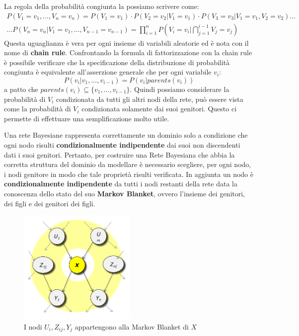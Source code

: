 La regola della probabilità congiunta la possiamo scrivere come:
\begin{equation*}
    \begin{aligned}
        P(V_1= v_1,...,V_n = v_n) = P(V_1 = v_1) \cdot P(V_2 = v_2|V_1 = v_1)
        \cdot P(V_3 = v_3|V_1 = v_1,V_2 = v_2) \dots \\
        \dots P(V_n = v_n|V_1 = v_1, \dots,V_{n-1}=v_{n-1}) = \prod_{i=1}^{n}
        P(V_i = v_i| \bigcap_{j = 1}^{i - 1} V_j= v_j)
    \end{aligned}
\end{equation*}
Questa uguaglianza è vera per ogni insieme di variabili aleatorie ed è nota con
il nome di \textbf{chain rule}. Confrontando la formula di fattorizzazione con
la chain rule è possibile verificare che la specificazione della distribuzione
di probabilità congiunta è equivalente all'asserzione generale che per ogni
variabile $v_i$:
\begin{equation}
    P(v_i|v_1,...,v_{i-1}) = P(v_i|parents(v_i))
\end{equation}
a patto che $parents(v_i) \subseteq \{v_1,...,v_{i-1}\}$. Quindi possiamo
considerare la probabilità di $V_i$ condizionata da tutti gli altri nodi della 
rete, può essere vista come la probabilità di $V_i$ condizionata solamente dai 
suoi genitori. Questo ci permette di effettuare una semplificazione molto utile.

Una rete Bayesiane rappresenta correttamente un dominio solo a condizione che ogni
nodo risulti \textbf{condizionalmente indipendente} dai suoi non discendenti
dati i suoi genitori. Pertanto, per costruire una Rete Bayesiana che abbia la
corretta struttura del dominio da modellare è necessario scegliere, per ogni nodo,
i nodi genitore in modo che tale proprietà risulti verificata. In aggiunta un nodo
è \textbf{condizionalmente indipendente} da tutti i nodi restanti della rete data
la conoscenza dello stato del suo \textbf{Markov Blanket}, ovvero l'insieme dei
genitori, dei figli e dei genitori dei figli.
\begin{figure}[!ht]
    \centering
    \includegraphics[width=0.5\textwidth]{./img/Reti/MarkovBlanket.png}
    \caption{I nodi $U_i, Z_{ij}, Y_j$ appartengono alla Markov Blanket di $X$}
    \label{fig:MarkovBlanket}
\end{figure}

